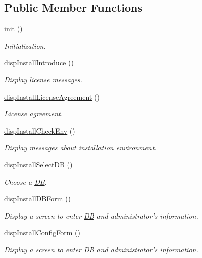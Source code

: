 \subsection*{Public Member Functions}
\begin{DoxyCompactItemize}
\item 
\hyperlink{classinstallView_ab24b18fa10e0268846ac0002d77ee453}{init} ()
\begin{DoxyCompactList}\small\item\em Initialization. \end{DoxyCompactList}\item 
\hyperlink{classinstallView_a811e5c499d36055efb16411c0f0946c1}{disp\-Install\-Introduce} ()
\begin{DoxyCompactList}\small\item\em Display license messages. \end{DoxyCompactList}\item 
\hyperlink{classinstallView_a7182430aaf7f9fb4c8e18d21e9e5a4e7}{disp\-Install\-License\-Agreement} ()
\begin{DoxyCompactList}\small\item\em License agreement. \end{DoxyCompactList}\item 
\hyperlink{classinstallView_ac73107933a9a9498aaef04380137794d}{disp\-Install\-Check\-Env} ()
\begin{DoxyCompactList}\small\item\em Display messages about installation environment. \end{DoxyCompactList}\item 
\hyperlink{classinstallView_aa3ee9747353f128111f628a5c9359c5f}{disp\-Install\-Select\-D\-B} ()
\begin{DoxyCompactList}\small\item\em Choose a \hyperlink{classDB}{D\-B}. \end{DoxyCompactList}\item 
\hyperlink{classinstallView_a61a05991e6aa8bf2278b9c438b70c8c7}{disp\-Install\-D\-B\-Form} ()
\begin{DoxyCompactList}\small\item\em Display a screen to enter \hyperlink{classDB}{D\-B} and administrator's information. \end{DoxyCompactList}\item 
\hyperlink{classinstallView_ad61c851960b71aad3b93cfd1a23149fb}{disp\-Install\-Config\-Form} ()
\begin{DoxyCompactList}\small\item\em Display a screen to enter \hyperlink{classDB}{D\-B} and administrator's information. \end{DoxyCompactList}\item 

\end{DoxyCompactItemize}
